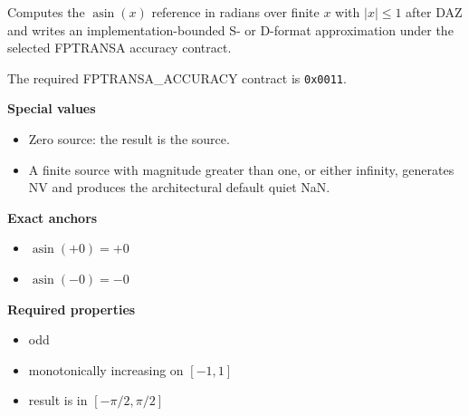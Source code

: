Computes the $\operatorname{asin}(x)$ reference in radians over finite $x$ with $|x| \le 1$ after DAZ and writes an implementation-bounded S- or D-format approximation under the selected FPTRANSA accuracy contract.

The required FPTRANSA\_ACCURACY contract is \texttt{0x0011}.

\textbf{Special values}\par
\begin{itemize}
\item Zero source: the result is the source.
\item A finite source with magnitude greater than one, or either infinity, generates NV and produces the architectural default quiet NaN.
\end{itemize}

\textbf{Exact anchors}\par
\begin{itemize}
\item $\operatorname{asin}(+0) = +0$
\item $\operatorname{asin}(-0) = -0$
\end{itemize}

\textbf{Required properties}\par
\begin{itemize}
\item odd
\item monotonically increasing on $[-1, 1]$
\item result is in $[-\pi/2, \pi/2]$
\end{itemize}
